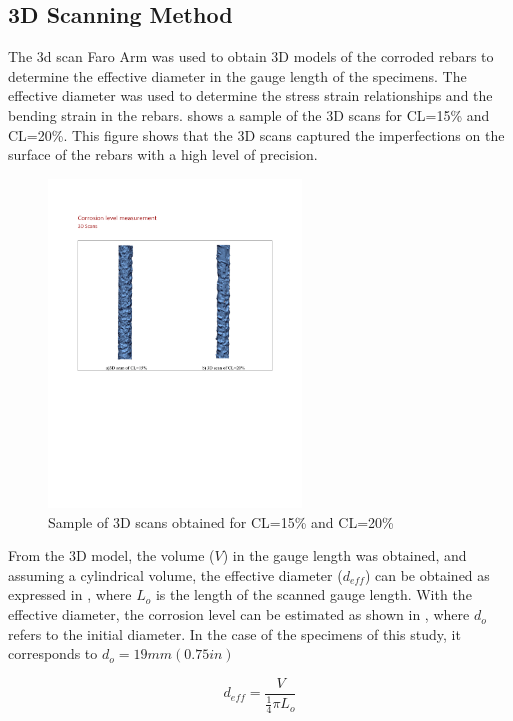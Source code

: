 \subsection{3D Scanning Method}

The 3d scan Faro Arm was used to obtain 3D models of the corroded rebars to determine the effective diameter in the gauge length of the specimens. The effective diameter was used to determine the stress strain relationships and the bending strain in the rebars.  shows a sample of the 3D scans for CL=15\% and CL=20\%. This figure shows that the 3D scans captured the imperfections on the surface of the rebars with a high level of precision. 

\begin{figure}[htbp]
	\centering
	\includegraphics[width=0.6\textwidth]{VAC Thesis 2.0/Chapter-4/figs/3dScans_sample.pdf}
	\caption{Sample of 3D scans obtained for CL=15\% and CL=20\%}
    \label{fig:3D_scans_sample}
\end{figure}

From the 3D model, the volume ($V$) in the gauge length was obtained, and assuming a cylindrical volume, the effective diameter ($d_{eff}$) can be obtained as expressed in , where $L_{o}$ is the length of the scanned gauge length. With the effective diameter, the corrosion level can be estimated as shown in , where $d_{o}$ refers to the initial diameter. In the case of the specimens of this study, it corresponds to  $d_{o}=19mm (0.75 in)$

\begin{equation}
    d_{eff}=\frac{V}{\frac{1}{4}\pi L_{o}}
    \label{eq:eff_diameter}
\end{equation}

